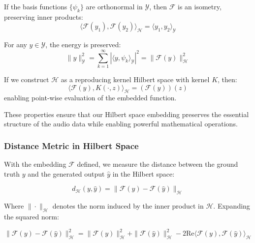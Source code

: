 \begin{proposition}
If the basis functions $\{\psi_k\}$ are orthonormal in $\mathcal{Y}$, then $\mathcal{F}$ is an isometry, preserving inner products:
\begin{equation}
\langle \mathcal{F}(y_1), \mathcal{F}(y_2) \rangle_{\mathcal{H}} = \langle y_1, y_2 \rangle_{\mathcal{Y}}
\end{equation}
\end{proposition}

\begin{proposition}
For any $y \in \mathcal{Y}$, the energy is preserved:
\begin{equation}
\|y\|_{\mathcal{Y}}^2 = \sum_{k=1}^{\infty} |\langle y, \psi_k \rangle_{\mathcal{Y}}|^2 = \|\mathcal{F}(y)\|_{\mathcal{H}}^2
\end{equation}
\end{proposition}

\begin{proposition}
If we construct $\mathcal{H}$ as a reproducing kernel Hilbert space with kernel $K$, then:
\begin{equation}
\langle \mathcal{F}(y), K(\cdot, z) \rangle_{\mathcal{H}} = (\mathcal{F}(y))(z)
\end{equation}
enabling point-wise evaluation of the embedded function.
\end{proposition}

These properties ensure that our Hilbert space embedding preserves the essential structure of the audio data while enabling powerful mathematical operations.

\subsubsection{Distance Metric in Hilbert Space}

With the embedding $\mathcal{F}$ defined, we measure the distance between the ground truth $y$ and the generated output $\hat{y}$ in the Hilbert space:

\begin{equation}
d_{\mathcal{H}}(y, \hat{y}) = \|\mathcal{F}(y) - \mathcal{F}(\hat{y})\|_{\mathcal{H}}
\end{equation}

Where $\|\cdot\|_{\mathcal{H}}$ denotes the norm induced by the inner product in $\mathcal{H}$. Expanding the squared norm:

\begin{equation}
\|\mathcal{F}(y) - \mathcal{F}(\hat{y})\|_{\mathcal{H}}^2 = \|\mathcal{F}(y)\|_{\mathcal{H}}^2 + \|\mathcal{F}(\hat{y})\|_{\mathcal{H}}^2 - 2\text{Re}\langle \mathcal{F}(y), \mathcal{F}(\hat{y}) \rangle_{\mathcal{H}}
\end{equation}

